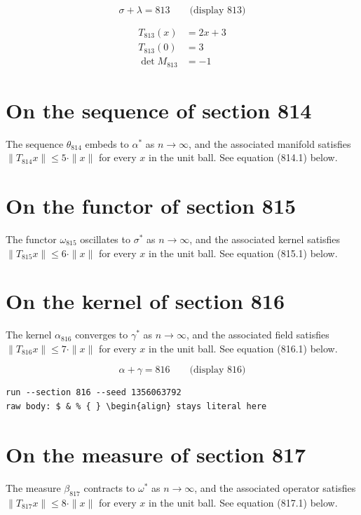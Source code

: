 \documentclass{article}
\begin{document}
$$
\sigma + \lambda = 813 \qquad \text{(display 813)}
$$

\begin{align}
T_{813}(x) &= 2 x + 3 \\
T_{813}(0) &= 3 \\
\det M_{813} &= -1
\end{align}

\section{On the sequence of section 814}
The sequence $\theta_{814}$ embeds to $\alpha^{*}$ as $n \to \infty$,
and the associated manifold satisfies $\|T_{814} x\| \leq 5 \cdot \|x\|$
for every $x$ in the unit ball. See equation (814.1) below.

\section{On the functor of section 815}
The functor $\omega_{815}$ oscillates to $\sigma^{*}$ as $n \to \infty$,
and the associated kernel satisfies $\|T_{815} x\| \leq 6 \cdot \|x\|$
for every $x$ in the unit ball. See equation (815.1) below.

\section{On the kernel of section 816}
The kernel $\alpha_{816}$ converges to $\gamma^{*}$ as $n \to \infty$,
and the associated field satisfies $\|T_{816} x\| \leq 7 \cdot \|x\|$
for every $x$ in the unit ball. See equation (816.1) below.

$$
\alpha + \gamma = 816 \qquad \text{(display 816)}
$$

\begin{verbatim}
run --section 816 --seed 1356063792
raw body: $ & % { } \begin{align} stays literal here
\end{verbatim}

\section{On the measure of section 817}
The measure $\beta_{817}$ contracts to $\omega^{*}$ as $n \to \infty$,
and the associated operator satisfies $\|T_{817} x\| \leq 8 \cdot \|x\|$
for every $x$ in the unit ball. See equation (817.1) below.
\end{document}
